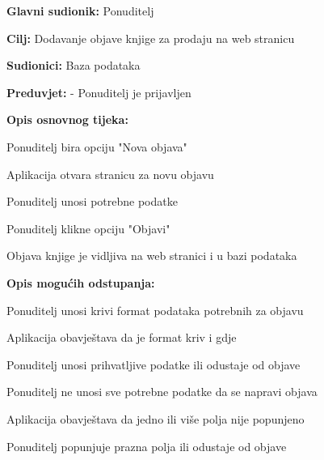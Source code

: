                     \noindent {}
					\begin{packed_item}
	
						\item \textbf{Glavni sudionik: } Ponuditelj
						\item  \textbf{Cilj:} Dodavanje objave knjige za prodaju na web stranicu
						\item  \textbf{Sudionici:} Baza podataka
						\item  \textbf{Preduvjet:} - Ponuditelj je prijavljen
						\item  \textbf{Opis osnovnog tijeka:}
						
						\item[] \begin{packed_enum}
	
							\item Ponuditelj bira opciju "Nova objava"
                            \item Aplikacija otvara stranicu za novu objavu
                            \item Ponuditelj unosi potrebne podatke
							\item Ponuditelj klikne opciju "Objavi"
                            \item Objava knjige je vidljiva na web stranici i u bazi podataka
						\end{packed_enum}
						
						\item  \textbf{Opis mogućih odstupanja:}
						
						\item[] \begin{packed_item}
	
							\item[2.a] Ponuditelj unosi krivi format podataka potrebnih za objavu
							\item[] \begin{packed_enum}
								
								\item Aplikacija obavještava da je format kriv i gdje
								\item Ponuditelj unosi prihvatljive podatke ili odustaje od objave
							\end{packed_enum}
                            \item[2.b] Ponuditelj ne unosi sve potrebne podatke da se napravi objava
                             \item[] \begin{packed_enum}
                                 \item Aplikacija obavještava da jedno ili više polja nije popunjeno
                                 \item Ponuditelj popunjuje prazna polja ili odustaje od objave
                             \end{packed_enum}
						\end{packed_item}
					\end{packed_item}

